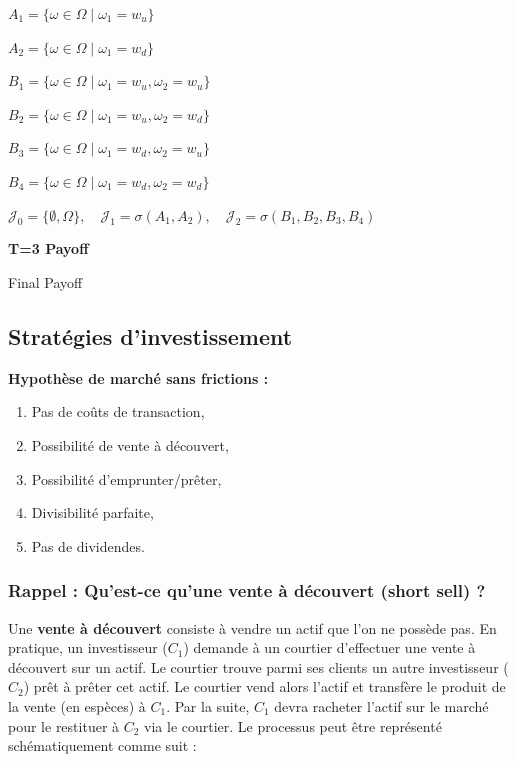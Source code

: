 \documentclass[12pt,a4paper]{article}
\numberwithin{equation}{section}
\theoremstyle{plain} %
\theoremstyle{definition} %
\theoremstyle{remark} %
\theoremstyle{myexample}
\theoremstyle{definition}
\begin{document}
$A_1 = \{\omega \in \Omega \mid \omega_1 = w_u\}$

$A_2 = \{\omega \in \Omega \mid \omega_1 = w_d\}$

$B_1 = \{\omega \in \Omega \mid \omega_1 = w_u, \omega_2 = w_u\}$

$B_2 = \{\omega \in \Omega \mid \omega_1 = w_u, \omega_2 = w_d\}$

$B_3 = \{\omega \in \Omega \mid \omega_1 = w_d, \omega_2 = w_u\}$

$B_4 = \{\omega \in \Omega \mid \omega_1 = w_d, \omega_2 = w_d\}$

\vspace{0.5cm}

$\mathcal{J}_0 = \{\emptyset, \Omega\}, \quad \mathcal{J}_1 = \sigma(A_1, A_2), \quad \mathcal{J}_2 = \sigma(B_1, B_2, B_3, B_4)$

\vspace{1cm}

\noindent \textbf{T=3 Payoff}

\noindent Final Payoff

\subsection{Stratégies d’investissement}

\textbf{Hypothèse de marché sans frictions :}
\begin{enumerate}
\item Pas de coûts de transaction,
\item Possibilité de vente à découvert,
\item Possibilité d’emprunter/prêter,
\item Divisibilité parfaite,
\item Pas de dividendes.
\end{enumerate}




\subsubsection*{Rappel : Qu’est-ce qu’une vente à découvert (short sell) ?}

Une \textbf{vente à découvert} consiste à vendre un actif que l’on ne possède pas.  
En pratique, un investisseur (\(C_1\)) demande à un courtier d’effectuer une vente à découvert sur un actif.  
Le courtier trouve parmi ses clients un autre investisseur (\(C_2\)) prêt à prêter cet actif.  
Le courtier vend alors l’actif et transfère le produit de la vente (en espèces) à \(C_1\).  
Par la suite, \(C_1\) devra racheter l’actif sur le marché pour le restituer à \(C_2\) via le courtier.  
Le processus peut être représenté schématiquement comme suit :
\end{document}
